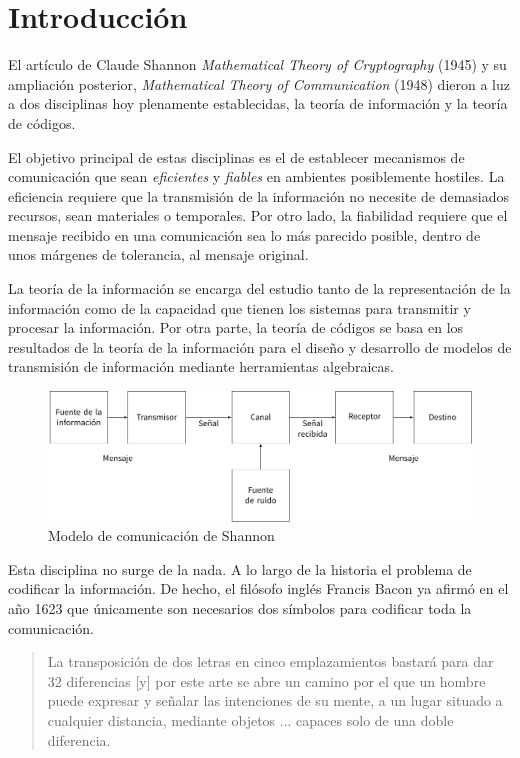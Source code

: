 \chapter*{Introducción}
 
El artículo de Claude Shannon \textit{Mathematical Theory of Cryptography} (1945) y su ampliación posterior, \textit{Mathematical Theory of Communication} (1948) dieron a luz a dos disciplinas hoy plenamente establecidas, la teoría de información y la teoría de códigos.

El objetivo principal de estas disciplinas es el de establecer mecanismos de comunicación que sean \emph{eficientes} y \emph{fiables} en ambientes posiblemente hostiles.
La eficiencia requiere que la transmisión de la información no necesite de demasiados recursos, sean materiales o temporales.
Por otro lado, la fiabilidad requiere que el mensaje recibido en una comunicación sea lo más parecido posible, dentro de unos márgenes de tolerancia, al mensaje original.

La teoría de la información se encarga del estudio tanto de la representación de la información como de la capacidad que tienen los sistemas para transmitir y procesar la información. 
Por otra parte, la teoría de códigos se basa en los resultados de la teoría de la información para el diseño y desarrollo de modelos de transmisión de información mediante herramientas algebraicas.

\begin{figure}
  \includegraphics[width=\textwidth]{assets/shannon-communication-model.pdf}
  \caption*{Modelo de comunicación de Shannon}
\end{figure}

Esta disciplina no surge de la nada.
A lo largo de la historia el problema de codificar la información.
De hecho, el filósofo inglés Francis Bacon ya afirmó en el año 1623 que únicamente son necesarios dos símbolos para codificar toda la comunicación.

\blockquote[{\cite[30]{dyson_catedral_2015}}]{La transposición de dos letras en cinco emplazamientos bastará para dar 32 diferencias [y] por este arte se abre un camino por el que un hombre puede expresar y señalar las intenciones de su mente, a un lugar situado a cualquier distancia, mediante objetos ... capaces solo de una doble diferencia.}


